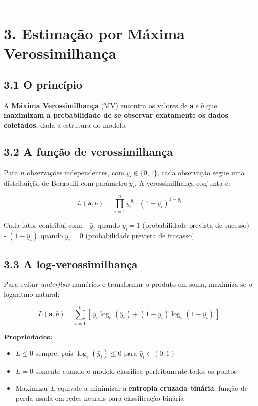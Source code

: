 \documentclass[
  letterpaper,
  DIV=11,
  numbers=noendperiod]{scrartcl}
\providecommand{\tightlist}{%
  \setlength{\itemsep}{0pt}\setlength{\parskip}{0pt}}
\begin{document}
\begin{center}\rule{0.5\linewidth}{0.5pt}\end{center}

\section{3. Estimação por Máxima
Verossimilhança}\label{estimauxe7uxe3o-por-muxe1xima-verossimilhanuxe7a}

\subsection{3.1 O princípio}\label{o-princuxedpio}

A \textbf{Máxima Verossimilhança} (MV) encontra os valores de
\(\mathbf{a}\) e \(b\) que \textbf{maximizam a probabilidade de se
observar exatamente os dados coletados}, dada a estrutura do modelo.

\subsection{3.2 A função de
verossimilhança}\label{a-funuxe7uxe3o-de-verossimilhanuxe7a}

Para \(n\) observações independentes, com \(y_i \in \{0,1\}\), cada
observação segue uma distribuição de Bernoulli com parâmetro
\(\hat{y}_i\). A verossimilhança conjunta é:

\[\mathcal{L}(\mathbf{a}, b) = \prod_{i=1}^{n} \hat{y}_i^{\;y_i} \cdot (1 - \hat{y}_i)^{1-y_i}\]

Cada fator contribui com: - \(\hat{y}_i\) quando \(y_i = 1\)
(probabilidade prevista de sucesso)\\
- \((1 - \hat{y}_i)\) quando \(y_i = 0\) (probabilidade prevista de
fracasso)

\subsection{3.3 A log-verossimilhança}\label{a-log-verossimilhanuxe7a}

Para evitar \emph{underflow} numérico e transformar o produto em soma,
maximiza-se o logaritmo natural:

\[L(\mathbf{a}, b) = \sum_{i=1}^{n}\left[\, y_i \log_e(\hat{y}_i) + (1-y_i)\log_e(1-\hat{y}_i) \,\right]\]

\textbf{Propriedades:}

\begin{itemize}
\tightlist
\item
  \(L \leq 0\) sempre, pois \(\log_e(\hat{y}_i) \leq 0\) para
  \(\hat{y}_i \in (0,1)\)
\item
  \(L = 0\) somente quando o modelo classifica perfeitamente todos os
  pontos
\item
  Maximizar \(L\) equivale a minimizar a \textbf{entropia cruzada
  binária}, função de perda usada em redes neurais para classificação
  binária
\end{itemize}
\end{document}

